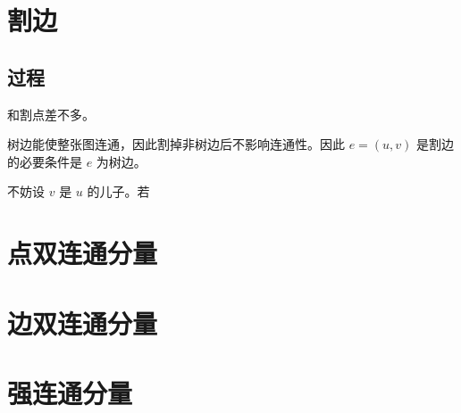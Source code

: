 \documentclass[11pt,oneside,a4paper,UTF8]{book}
\begin{document}
	\section{割边}
	\subsection{过程}
	和割点差不多。\par
	树边能使整张图连通，因此割掉非树边后不影响连通性。因此 $e=(u,v)$ 是割边的必要条件是 $e$ 为树边。\par
	不妨设 $v$ 是 $u$ 的儿子。若
	
	\section{点双连通分量}
	\section{边双连通分量}
	\section{强连通分量}
	
	
\end{document}
